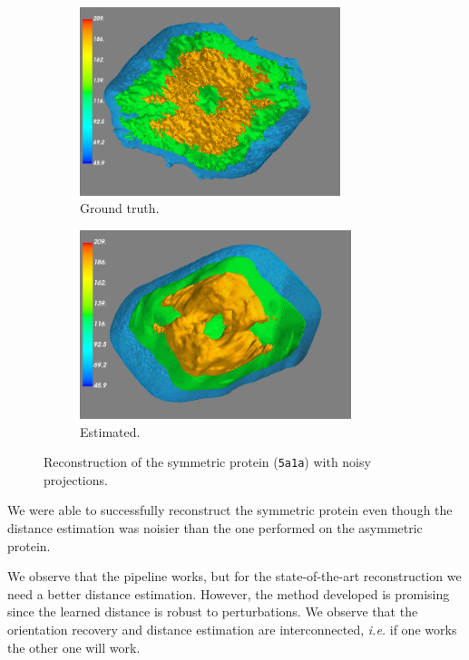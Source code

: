 \begin{figure}[ht!]
    \centering
    \begin{subfigure}[b]{0.45\textwidth}
        \includegraphics[height=5.5cm]{images/5a1a_ground_truth.png}
        \caption{Ground truth.}
    \end{subfigure}
    \hfill
    \begin{subfigure}[b]{0.5\textwidth}
    \centering
        \includegraphics[height=5.5cm]{images/5a1a_aligned.png}
        \caption{Estimated.}
    \end{subfigure}
    \caption{
        Reconstruction of the symmetric protein (\texttt{5a1a}) with noisy projections.
    }\label{fig:5a1a-reconstruction-noise0}
\end{figure}

We were able to successfully reconstruct the symmetric protein even though the distance estimation was noisier than the one performed on the asymmetric protein. 

We observe that the pipeline works, but for the state-of-the-art reconstruction we need a better distance estimation. 
However, the method developed is promising since the learned distance is robust to perturbations. 
We observe that the orientation recovery and distance estimation are interconnected, \textit{i.e.} if one works the other one will work.

